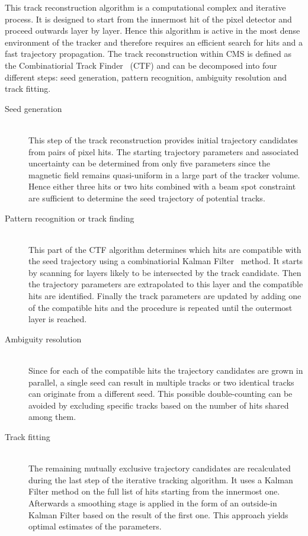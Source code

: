 This track reconstruction algorithm is a computational complex and iterative process. It is designed to start from the innermost hit of the pixel detector and proceed outwards layer by layer. Hence this algorithm is active in the most dense environment of the tracker and therefore requires an efficient search for hits and a fast trajectory propagation. The track reconstruction within CMS is defined as the Combinatiorial Track Finder~\cite{TrackAndPVReco} (CTF) and can be decomposed into four different steps: seed generation, pattern recognition, ambiguity resolution and track fitting.
\begin{myindentpar}
  \begin{description}
    \item[Seed generation] \hfill \\
    This step of the track reconstruction provides initial trajectory candidates from pairs of pixel hits. 
    The starting trajectory parameters and associated uncertainty can be determined from only five parameters since the magnetic field remains quasi-uniform in a large part of the tracker volume. Hence either three hits or two hits combined with a beam spot constraint are sufficient to determine the seed trajectory of potential tracks.
    \item[Pattern recognition or track finding] \hfill \\
    This part of the CTF algorithm determines which hits are compatible with the seed trajectory using a combinatiorial Kalman Filter~\cite{KalmanFilter} method.
    It starts by scanning for layers likely to be intersected by the track candidate. Then the trajectory parameters are extrapolated to this layer and the compatible hits are identified. Finally the track parameters are updated by adding one of the compatible hits and the procedure is repeated until the outermost layer is reached.
    \item[Ambiguity resolution] \hfill \\
    Since for each of the compatible hits the trajectory candidates are grown in parallel, a single seed can result in multiple tracks or two identical tracks can originate from a different seed. This possible double-counting can be avoided by excluding specific tracks based on the number of hits shared among them. 
    \item[Track fitting] \hfill \\
    The remaining mutually exclusive trajectory candidates are recalculated during the last step of the iterative tracking algorithm. It uses a Kalman Filter method on the full list of hits starting from the innermost one. Afterwards a smoothing stage is applied in the form of an outside-in Kalman Filter based on the result of the first one. This approach yields optimal estimates of the parameters.
  \end{description}
\end{myindentpar}
